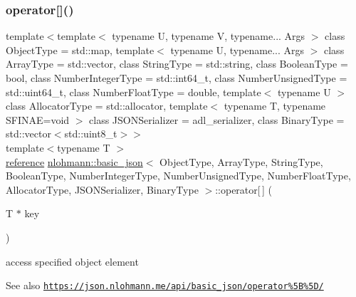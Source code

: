 \subsubsection{\texorpdfstring{operator[]()}{operator[]()}\hspace{0.1cm}{\footnotesize\ttfamily [5/8]}}
{\footnotesize\ttfamily template$<$template$<$ typename U, typename V, typename... Args $>$ class Object\+Type = std\+::map, template$<$ typename U, typename... Args $>$ class Array\+Type = std\+::vector, class String\+Type  = std\+::string, class Boolean\+Type  = bool, class Number\+Integer\+Type  = std\+::int64\+\_\+t, class Number\+Unsigned\+Type  = std\+::uint64\+\_\+t, class Number\+Float\+Type  = double, template$<$ typename U $>$ class Allocator\+Type = std\+::allocator, template$<$ typename T, typename S\+F\+I\+N\+A\+E=void $>$ class J\+S\+O\+N\+Serializer = adl\+\_\+serializer, class Binary\+Type  = std\+::vector$<$std\+::uint8\+\_\+t$>$$>$ \\
template$<$typename T $>$ \\
\hyperlink{classnlohmann_1_1basic__json_a220ae98554a76205fb7f8822d36b2d5a}{reference} \hyperlink{classnlohmann_1_1basic__json}{nlohmann\+::basic\+\_\+json}$<$ Object\+Type, Array\+Type, String\+Type, Boolean\+Type, Number\+Integer\+Type, Number\+Unsigned\+Type, Number\+Float\+Type, Allocator\+Type, J\+S\+O\+N\+Serializer, Binary\+Type $>$\+::operator\mbox{[}$\,$\mbox{]} (\begin{DoxyParamCaption}\item[{T $\ast$}]{key }\end{DoxyParamCaption})\hspace{0.3cm}{\ttfamily [inline]}}



access specified object element 

\begin{DoxySeeAlso}{See also}
\href{https://json.nlohmann.me/api/basic_json/operator%5B%5D/}{\tt https\+://json.\+nlohmann.\+me/api/basic\+\_\+json/operator\%5\+B\%5\+D/} 
\end{DoxySeeAlso}
\mbox{\label{classnlohmann_1_1basic__json_a11bbe874496eb7b29a5549e0637de59e}} 
